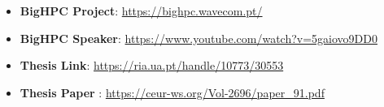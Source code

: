 \documentclass[10pt,a4paper,ragged2e,withhyper]{altacv}
\begin{document}
\begin{itemize}
      \item \textbf{BigHPC Project}: \url{https://bighpc.wavecom.pt/}
      \item \textbf{BigHPC Speaker}: \url{https://www.youtube.com/watch?v=5gaiovo9DD0}
      \item \textbf{Thesis Link}: \url{https://ria.ua.pt/handle/10773/30553}
      \item \textbf{Thesis Paper }: \url{https://ceur-ws.org/Vol-2696/paper_91.pdf}
\end{itemize}
\end{document}
